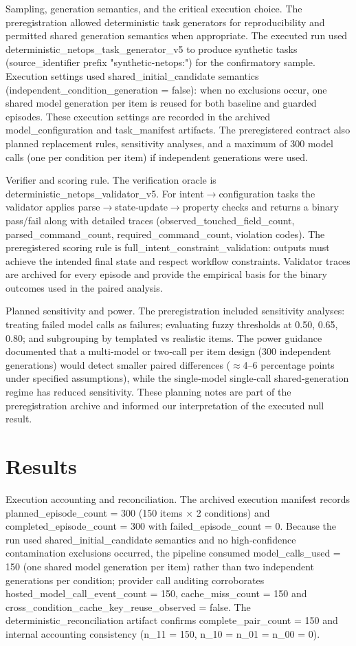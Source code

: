 \documentclass[conference]{IEEEtran}
\begin{document}
Sampling, generation semantics, and the critical execution choice. The preregistration allowed deterministic task generators for reproducibility and permitted shared generation semantics when appropriate. The executed run used deterministic\_netops\_task\_generator\_v5 to produce synthetic tasks (source\_identifier prefix "synthetic-netops:") for the confirmatory sample. Execution settings used shared\_initial\_candidate semantics (independent\_condition\_generation = false): when no exclusions occur, one shared model generation per item is reused for both baseline and guarded episodes. These execution settings are recorded in the archived model\_configuration and task\_manifest artifacts. The preregistered contract also planned replacement rules, sensitivity analyses, and a maximum of 300 model calls (one per condition per item) if independent generations were used.

Verifier and scoring rule. The verification oracle is deterministic\_netops\_validator\_v5. For intent\ensuremath{\rightarrow}configuration tasks the validator applies parse\ensuremath{\rightarrow}state‑update\ensuremath{\rightarrow}property checks and returns a binary pass/fail along with detailed traces (observed\_touched\_field\_count, parsed\_command\_count, required\_command\_count, violation codes). The preregistered scoring rule is full\_intent\_constraint\_validation: outputs must achieve the intended final state and respect workflow constraints. Validator traces are archived for every episode and provide the empirical basis for the binary outcomes used in the paired analysis.

Planned sensitivity and power. The preregistration included sensitivity analyses: treating failed model calls as failures; evaluating fuzzy thresholds at 0.50, 0.65, 0.80; and subgrouping by templated vs realistic items. The power guidance documented that a multi‑model or two‑call per item design (300 independent generations) would detect smaller paired differences (\ensuremath{\approx}4--6 percentage points under specified assumptions), while the single‑model single‑call shared‑generation regime has reduced sensitivity. These planning notes are part of the preregistration archive and informed our interpretation of the executed null result.

\section{Results}
Execution accounting and reconciliation. The archived execution manifest records planned\_episode\_count = 300 (150 items \ensuremath{\times} 2 conditions) and completed\_episode\_count = 300 with failed\_episode\_count = 0. Because the run used shared\_initial\_candidate semantics and no high‑confidence contamination exclusions occurred, the pipeline consumed model\_calls\_used = 150 (one shared model generation per item) rather than two independent generations per condition; provider call auditing corroborates hosted\_model\_call\_event\_count = 150, cache\_miss\_count = 150 and cross\_condition\_cache\_key\_reuse\_observed = false. The deterministic\_reconciliation artifact confirms complete\_pair\_count = 150 and internal accounting consistency (n\_11 = 150, n\_10 = n\_01 = n\_00 = 0).
\end{document}

